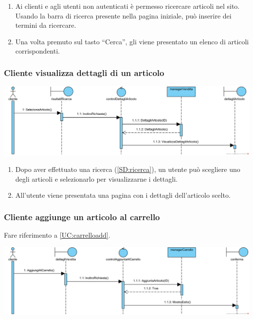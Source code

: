\documentclass[12pt]{article}
\begin{document}
\begin{enumerate}
\item Ai clienti e agli utenti non autenticati è permesso ricercare articoli nel sito. Usando la barra di ricerca presente nella pagina iniziale, può inserire dei termini da ricercare.
\item Una volta premuto sul tasto ``Cerca'', gli viene presentato un elenco di articoli corrispondenti.
\end{enumerate}

\subsubsection{Cliente visualizza dettagli di un articolo}
\label{SD:dettagli}

\begin{center}
\includegraphics[width=\textwidth]{SequenceDiagram/ClienteArticoloSeleziona}
\end{center}

\begin{enumerate}
\item Dopo aver effettuato una ricerca (\ref{SD:ricerca}), un utente può scegliere uno degli articoli e selezionarlo per visualizzarne i dettagli.
\item All'utente viene presentata una pagina con i dettagli dell'articolo scelto.
\end{enumerate}

\newpage

\subsubsection{Cliente aggiunge un articolo al carrello}
\label{SD:aggiunta}

Fare riferimento a \ref{UC:carrelloadd}. \\

\begin{center}
\includegraphics[width=\textwidth]{SequenceDiagram/ClienteCarrelloAggiunge}
\end{center}
\end{document}
